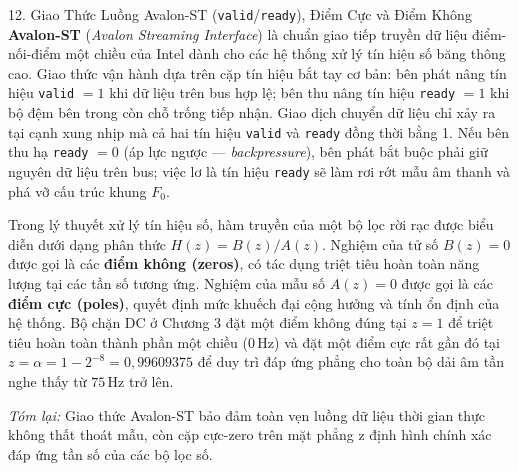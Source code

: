 \begin{feynmanbox}{12. Giao Thức Luồng Avalon-ST (\texttt{valid}/\texttt{ready}), Điểm Cực và Điểm Không}
\textbf{Avalon-ST} (\emph{Avalon Streaming Interface}) là chuẩn giao tiếp truyền dữ liệu điểm-nối-điểm một chiều của Intel dành cho các hệ thống xử lý tín hiệu số băng thông cao. Giao thức vận hành dựa trên cặp tín hiệu bắt tay cơ bản: bên phát nâng tín hiệu \texttt{valid} $= 1$ khi dữ liệu trên bus hợp lệ; bên thu nâng tín hiệu \texttt{ready} $= 1$ khi bộ đệm bên trong còn chỗ trống tiếp nhận. Giao dịch chuyển dữ liệu chỉ xảy ra tại cạnh xung nhịp mà cả hai tín hiệu \texttt{valid} và \texttt{ready} đồng thời bằng 1. Nếu bên thu hạ \texttt{ready} $= 0$ (áp lực ngược --- \emph{backpressure}), bên phát bắt buộc phải giữ nguyên dữ liệu trên bus; việc lơ là tín hiệu \texttt{ready} sẽ làm rơi rớt mẫu âm thanh và phá vỡ cấu trúc khung $F_0$.

Trong lý thuyết xử lý tín hiệu số, hàm truyền của một bộ lọc rời rạc được biểu diễn dưới dạng phân thức $H(z) = B(z)/A(z)$. Nghiệm của tử số $B(z) = 0$ được gọi là các \textbf{điểm không (zeros)}, có tác dụng triệt tiêu hoàn toàn năng lượng tại các tần số tương ứng. Nghiệm của mẫu số $A(z) = 0$ được gọi là các \textbf{điểm cực (poles)}, quyết định mức khuếch đại cộng hưởng và tính ổn định của hệ thống. Bộ chặn DC ở Chương 3 đặt một điểm không đúng tại $z = 1$ để triệt tiêu hoàn toàn thành phần một chiều ($0\,\text{Hz}$) và đặt một điểm cực rất gần đó tại $z = \alpha = 1 - 2^{-8} = 0{,}99609375$ để duy trì đáp ứng phẳng cho toàn bộ dải âm tần nghe thấy từ $75\,\text{Hz}$ trở lên.

\emph{Tóm lại:} Giao thức Avalon-ST bảo đảm toàn vẹn luồng dữ liệu thời gian thực không thất thoát mẫu, còn cặp cực-zero trên mặt phẳng z định hình chính xác đáp ứng tần số của các bộ lọc số.
\end{feynmanbox}

